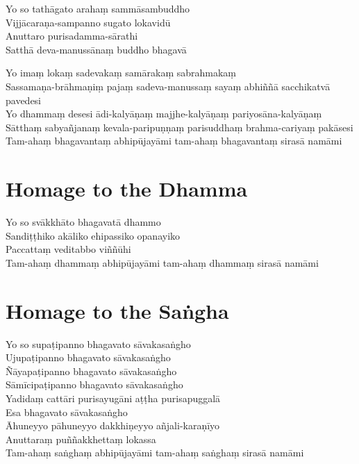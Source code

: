 \begin{leader}
\end{leader}

Yo so tathāgato arahaṃ sammāsambuddho\\
Vijjācaraṇa-sampanno sugato lokavidū\\
Anuttaro purisadamma-sārathi\\
Satthā deva-manussānaṃ buddho bhagavā

Yo imaṃ lokaṃ sadevakaṃ samārakaṃ sabrahmakaṃ\\
Sassamaṇa-brāhmaṇiṃ pajaṃ sadeva-manussaṃ sayaṃ abhiññā sacchikatvā pavedesi\\
Yo dhammaṃ desesi ādi-kalyāṇaṃ majjhe-kalyāṇaṃ pariyosāna-kalyāṇaṃ\\
Sātthaṃ sabyañjanaṃ kevala-paripuṇṇaṃ parisuddhaṃ brahma-cariyaṃ pakāsesi\\
Tam-ahaṃ bhagavantaṃ abhipūjayāmi tam-ahaṃ bhagavantaṃ sirasā namāmi

\section*{Homage to the Dhamma}

\begin{leader}
\end{leader}

Yo so svākkhāto bhagavatā dhammo\\
Sandiṭṭhiko akāliko ehipassiko opanayiko\\
Paccattaṃ veditabbo viññūhi\\
Tam-ahaṃ dhammaṃ abhipūjayāmi tam-ahaṃ dhammaṃ sirasā namāmi

\section*{Homage to the Saṅgha}

\enlargethispage{\baselineskip}

\begin{leader}
\end{leader}

Yo so supaṭipanno bhagavato sāvakasaṅgho\\
Ujupaṭipanno bhagavato sāvakasaṅgho\\
Ñāyapaṭipanno bhagavato sāvakasaṅgho\\
Sāmīcipaṭipanno bhagavato sāvakasaṅgho\\
Yadidaṃ cattāri purisayugāni aṭṭha purisapuggalā\\
Esa bhagavato sāvakasaṅgho\\
Āhuneyyo pāhuneyyo dakkhiṇeyyo añjali-karaṇīyo\\
Anuttaraṃ puññakkhettaṃ lokassa\\
Tam-ahaṃ saṅghaṃ abhipūjayāmi tam-ahaṃ saṅghaṃ sirasā namāmi

